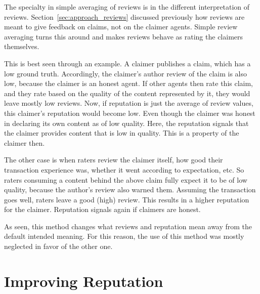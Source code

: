 \documentclass[%
    ]{\PathToTumTemplate/thesis/tum_thesis}
\begin{document}
The specialty in simple averaging of reviews is in the different interpretation of reviews.
Section~\ref{sec:approach_reviews} discussed previously how reviews are meant to give feedback on claims, not on the claimer agents.
Simple review averaging turns this around and makes reviews behave as rating the claimers themselves.

This is best seen through an example.
A claimer publishes a claim, which has a low ground truth.
Accordingly, the claimer's author review of the claim is also low, because the claimer is an honest agent.
If other agents then rate this claim, and they rate based on the quality of the content represented by it, they would leave mostly low reviews.
Now, if reputation is just the average of review values, this claimer's reputation would become low.
Even though the claimer was honest in declaring its own content as of low quality.
Here, the reputation signals that the claimer provides content that is low in quality.
This is a property of the claimer then.

The other case is when raters review the claimer itself, how good their transaction experience was, whether it went according to expectation, etc.
So raters consuming a content behind the above claim fully expect it to be of low quality, because the author's review also warned them.
Assuming the transaction goes well, raters leave a good (high) review.
This results in a higher reputation for the claimer.
Reputation signals again if claimers are honest.

As seen, this method changes what reviews and reputation mean away from the default intended meaning.
For this reason, the use of this method was mostly neglected in favor of the other one.



\section{Improving Reputation}\label{sec:approach_improvements}
\end{document}
